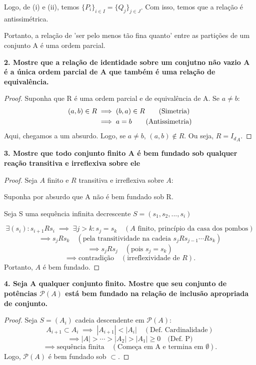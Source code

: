 \documentclass{article}
\begin{document}
Logo, de (i) e (ii), temos $\{P_i\}_{i \in I} = \{Q_j\}_{j \in J}$. Com isso, temos que a relação é antissimétrica.

Portanto, a  relação de 'ser pelo menos tão fina quanto' entre as partições de um conjunto A é uma ordem parcial.

\bigskip

\textbf{2. Mostre que a relação de identidade sobre um conjutno não vazio A é a única ordem parcial de A que também é uma relação de equivalência.}

\begin{proof}
	Suponha que R é uma ordem parcial e de equivalência de A.
	Se $a \neq b$:
	\begin{align*}
		(a, b) \in R
		 & \implies (b, a) \in R \tag*{\text{(Simetria)}} \\
		 & \implies a = b \tag*{\text{(Antissimetria)}}
	\end{align*}
	Aqui, chegamos a um absurdo. Logo, se $ a \neq b$, $(a,b) \notin R$. Ou seja, $R = {I_d}_A$.
\end{proof}

\bigskip

\textbf{3. Mostre que todo conjunto finito A é bem fundado sob qualquer reação transitiva e irreflexiva sobre ele}

\begin{proof}
	Seja $A$ finito e $R$ transitiva e irreflexiva sobre $A$:

	Suponha por absurdo que A não é bem fundado sob R.

	Seja S uma sequência infinita decrescente $S = (s_1,s_2,...,s_i)$

	\[
		\exists (s_i): s_{i+1}Rs_i
		\;\implies\; \exists j>k: s_j=s_k \quad (\text{$A$ finito, princípio da casa dos pombos})
	\]
	\[
		\implies s_jRs_k \quad (\text{pela transitividade na cadeia $s_jRs_{j-1}\cdots Rs_k$})
	\]
	\[
		\implies s_jRs_j \quad (\text{pois $s_j=s_k$})
	\]
	\[
		\implies \text{contradição} \quad (\text{irreflexividade de $R$}).
	\]
	Portanto, $A$ é bem fundado.
\end{proof}

\bigskip

\textbf{4. Seja A qualquer conjunto finito. Mostre que seu conjunto de potências $\mathscr{P}(A)$ está bem fundado na relação de inclusão apropriada de conjunto.}

\begin{proof}
	Seja $S=(A_i)$ cadeia descendente em $\mathscr{P}(A)$:
	\[
		A_{i+1}\subset A_i
		\;\implies\; |A_{i+1}|<|A_i| \quad (\text{Def. Cardinalidade})
	\]
	\[
		\implies |A| > \cdots > |A_2| > |A_1| \ge 0 \quad (\text{Def. P)}
	\]
	\[
		\implies \text{sequência finita} \quad (\text{Começa em A e termina em } \emptyset).
	\]
	Logo, $\mathscr{P}(A)$ é bem fundado sob $\subset$.
\end{proof}
\end{document}
